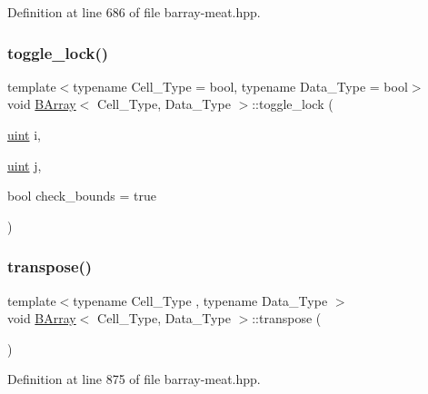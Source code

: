 Definition at line 686 of file barray-\/meat.\+hpp.

\mbox{\label{class_b_array_ac5079b33fc5300dd912cdf85bb51ac53}} 
\subsubsection{\texorpdfstring{toggle\+\_\+lock()}{toggle\_lock()}}
{\footnotesize\ttfamily template$<$typename Cell\+\_\+\+Type = bool, typename Data\+\_\+\+Type = bool$>$ \\
void \hyperlink{class_b_array}{B\+Array}$<$ Cell\+\_\+\+Type, Data\+\_\+\+Type $>$\+::toggle\+\_\+lock (\begin{DoxyParamCaption}\item[{\hyperlink{typedefs_8hpp_a91ad9478d81a7aaf2593e8d9c3d06a14}{uint}}]{i,  }\item[{\hyperlink{typedefs_8hpp_a91ad9478d81a7aaf2593e8d9c3d06a14}{uint}}]{j,  }\item[{bool}]{check\+\_\+bounds = {\ttfamily true} }\end{DoxyParamCaption})}

\mbox{\label{class_b_array_a0284f7f2148b7c1b474ebe01f6548b98}} 
\subsubsection{\texorpdfstring{transpose()}{transpose()}}
{\footnotesize\ttfamily template$<$typename Cell\+\_\+\+Type , typename Data\+\_\+\+Type $>$ \\
void \hyperlink{class_b_array}{B\+Array}$<$ Cell\+\_\+\+Type, Data\+\_\+\+Type $>$\+::transpose (\begin{DoxyParamCaption}{ }\end{DoxyParamCaption})\hspace{0.3cm}{\ttfamily [inline]}}



Definition at line 875 of file barray-\/meat.\+hpp.

\mbox{\label{class_b_array_a0fa473027d00ec53ed08eaea03ac3ef7}} 
